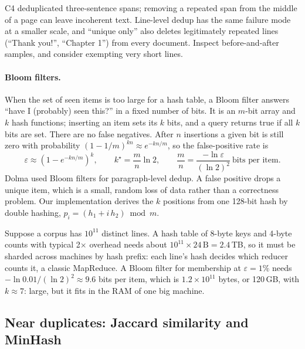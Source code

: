 \begin{pitfall}
C4 deduplicated three-sentence spans; removing a repeated span from the middle of a page can
leave incoherent text. Line-level dedup has the same failure mode at a smaller scale, and
``unique only'' also deletes legitimately repeated lines (``Thank you!'', ``Chapter 1'') from
every document. Inspect before-and-after samples, and consider exempting very short lines.
\end{pitfall}

\paragraph{Bloom filters.} When the set of seen items is too large for a hash table, a Bloom
filter answers ``have I (probably) seen this?'' in a fixed number of bits. It is an $m$-bit array
and $k$ hash functions; inserting an item sets its $k$ bits, and a query returns true if all $k$
bits are set. There are no false negatives. After $n$ insertions a given bit is still zero with
probability $(1-1/m)^{kn}\approx e^{-kn/m}$, so the false-positive rate is
\begin{equation}
\varepsilon \approx \left(1-e^{-kn/m}\right)^{k},
\qquad k^\star = \frac{m}{n}\ln 2,\qquad
\frac{m}{n} = \frac{-\ln\varepsilon}{(\ln 2)^2}\ \text{bits per item}.
\label{eq:data:bloom}
\end{equation}
Dolma used Bloom filters for paragraph-level dedup. A false positive drops a unique item, which
is a small, random loss of data rather than a correctness problem. Our implementation derives
the $k$ positions from one 128-bit hash by double hashing, $p_i = (h_1 + i\,h_2)\bmod m$.

\begin{napkinmath}
Suppose a corpus has $10^{11}$ distinct lines. A hash table of 8-byte keys and 4-byte counts with
typical 2$\times$ overhead needs about $10^{11}\times 24\,\text{B}=2.4$\,TB, so it must be sharded
across machines by hash prefix: each line's hash decides which reducer counts it, a classic
MapReduce. A Bloom filter for membership at $\varepsilon=1\%$ needs
$-\ln 0.01/(\ln 2)^2 \approx 9.6$ bits per item, which is $1.2\times10^{11}$ bytes, or 120\,GB, with
$k\approx 7$: large, but it fits in the RAM of one big machine.
\end{napkinmath}

\subsection{Near duplicates: Jaccard similarity and MinHash}\label{sec:data:minhash}

